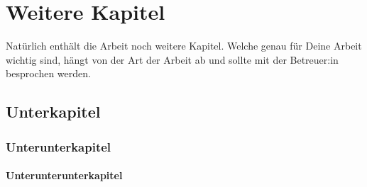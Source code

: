 \chapter{Weitere Kapitel}
Natürlich enthält die Arbeit noch weitere Kapitel. Welche genau für Deine Arbeit wichtig sind, hängt von der Art der Arbeit ab und sollte mit der Betreuer:in besprochen werden.

\section{Unterkapitel}

\subsection{Unterunterkapitel}

\subsubsection{Unterunterunterkapitel}
